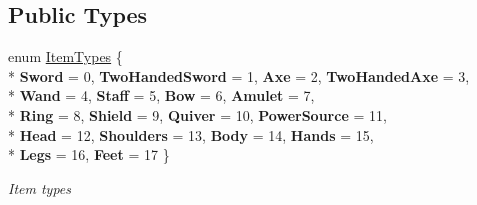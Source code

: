\subsection*{Public Types}
\begin{DoxyCompactItemize}
\item 
enum \hyperlink{class_hel_project_1_1_game_world_1_1_h_item_a7440e7b22ff0e62bcaf89a513716357b}{Item\+Types} \{ \\*
{\bfseries Sword} = 0, 
{\bfseries Two\+Handed\+Sword} = 1, 
{\bfseries Axe} = 2, 
{\bfseries Two\+Handed\+Axe} = 3, 
\\*
{\bfseries Wand} = 4, 
{\bfseries Staff} = 5, 
{\bfseries Bow} = 6, 
{\bfseries Amulet} = 7, 
\\*
{\bfseries Ring} = 8, 
{\bfseries Shield} = 9, 
{\bfseries Quiver} = 10, 
{\bfseries Power\+Source} = 11, 
\\*
{\bfseries Head} = 12, 
{\bfseries Shoulders} = 13, 
{\bfseries Body} = 14, 
{\bfseries Hands} = 15, 
\\*
{\bfseries Legs} = 16, 
{\bfseries Feet} = 17
 \}
\begin{DoxyCompactList}\small\item\em Item types \end{DoxyCompactList}\end{DoxyCompactItemize}
